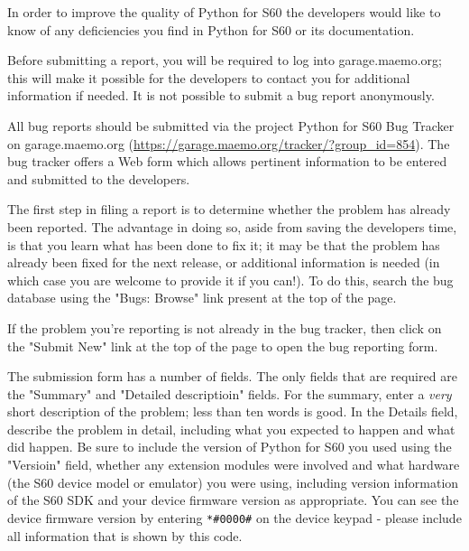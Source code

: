 %
%
%

\label{reporting-bugs}

In order to improve the quality of Python for S60 the developers would like to 
know of any deficiencies you find in Python for S60 or its documentation.

Before submitting a report, you will be required to log into garage.maemo.org;
this will make it possible for the developers to contact you
for additional information if needed.  It is not possible to submit a
bug report anonymously.

All bug reports should be submitted via the project Python for S60 Bug Tracker on 
garage.maemo.org (\url{https://garage.maemo.org/tracker/?group_id=854}). The bug 
tracker offers a Web form which allows pertinent information to be entered and 
submitted to the developers.

The first step in filing a report is to determine whether the problem
has already been reported.  The advantage in doing so, aside from
saving the developers time, is that you learn what has been done to
fix it; it may be that the problem has already been fixed for the next
release, or additional information is needed (in which case you are
welcome to provide it if you can!).  To do this, search the bug
database using the "Bugs: Browse" link present at the top of the page.

If the problem you're reporting is not already in the bug tracker, then click on the
"Submit New" link at the top of the page to open the bug reporting form.

The submission form has a number of fields.  The only fields that are required 
are the "Summary" and "Detailed descriptioin" fields.  For the summary, enter a 
\emph{very} short description of the problem; less than ten words is good.  In 
the Details field, describe the problem in detail, including what you
expected to happen and what did happen.  Be sure to include the
version of Python for S60 you used using the "Versioin" field, whether any extension modules were
involved and what hardware (the S60 device model or emulator) you were
using, including version information of the S60 SDK and your device
firmware version as appropriate. You can see the device firmware
version by entering \verb|*#0000#| on the device keypad - please
include all information that is shown by this code.

